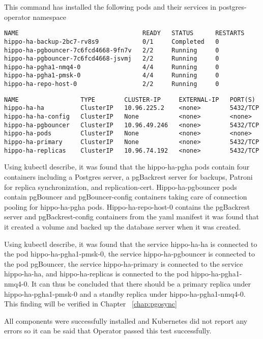 This command has installed the following pods and their services in postgres-operator namespace

\begin{verbatim}
NAME                                  READY   STATUS      RESTARTS
hippo-ha-backup-2bc7-rv8s9            0/1     Completed   0
hippo-ha-pgbouncer-7c6fcd4668-9fn7v   2/2     Running     0
hippo-ha-pgbouncer-7c6fcd4668-jsvmj   2/2     Running     0
hippo-ha-pgha1-nmq4-0                 4/4     Running     0
hippo-ha-pgha1-pmsk-0                 4/4     Running     0
hippo-ha-repo-host-0                  2/2     Running     0
\end{verbatim}

\begin{verbatim}
NAME                 TYPE        CLUSTER-IP     EXTERNAL-IP   PORT(S)
hippo-ha-ha          ClusterIP   10.96.225.2    <none>        5432/TCP
hippo-ha-ha-config   ClusterIP   None           <none>        <none>
hippo-ha-pgbouncer   ClusterIP   10.96.49.246   <none>        5432/TCP
hippo-ha-pods        ClusterIP   None           <none>        <none>
hippo-ha-primary     ClusterIP   None           <none>        5432/TCP
hippo-ha-replicas    ClusterIP   10.96.74.192   <none>        5432/TCP
\end{verbatim}

Using kubectl describe, it was found that the hippo-ha-pgha pods contain four containers including a Postgres server, a pgBackrest server for backups, Patroni for replica synchronization, and replication-cert. Hippo-ha-pgbouncer pods contain pgBouncer and pgBouncer-config containers taking care of connection pooling for hippo-ha-pgha pods. Hippo-ha-repo-host-0 contains the pgBackrest server and pgBackrest-config containers from the yaml manifest it was found that it created a volume and backed up the database server when it was created.

Using kubectl describe, it was found that the service hippo-ha-ha is connected to the pod hippo-ha-pgha1-pmsk-0, the service hippo-ha-pgbouncer is connected to the pod pgBouncer, the service hippo-ha-primary is connected to the service hippo-ha-ha, and hippo-ha-replicas is connected to the pod hippo-ha-pgha1-nmq4-0. It can thus be concluded that there should be a primary replica under hippo-ha-pgha1-pmsk-0 and a standby replica under hippo-ha-pgha1-nmq4-0. This finding will be verified in Chapter ~\ref{chap:pgosync}

All components were successfully installed and Kubernetes did not report any errors so it can be said that Operator passed this test successfully.

